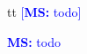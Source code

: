 \documentclass[envcountsame]{llncs}
\newcommand\MS[2][r]{\ifx t#1 \textcolor{blue}{[\textbf{MS:} #2]}
  \else \begin{center}\textcolor{blue}{\textbf{MS:} #2} \end{center} \fi}
\begin{document}

\MS[t]{todo}



\end{document}
